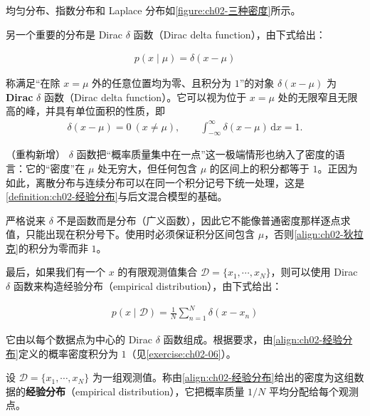 \documentclass[../../main.tex]{subfiles}
\begin{document}
均匀分布、指数分布和 Laplace 分布如\cref{figure:ch02-三种密度}所示。

另一个重要的分布是 Dirac $\delta$ 函数（Dirac delta function），由下式给出：

\begin{align}
  p(x\mid\mu) = \delta(x-\mu)
  \label{align:ch02-狄拉克}
\end{align}

\begin{definition}\label{definition:ch02-狄拉克delta}
称满足“在除 $x=\mu$ 外的任意位置均为零、且积分为 $1$”的对象 $\delta(x-\mu)$ 为 \textbf{Dirac} $\delta$ 函数（Dirac delta function）。它可以视为位于 $x=\mu$ 处的无限窄且无限高的峰，并具有单位面积的性质，即
\begin{align*}
  \delta(x-\mu) = 0 \ (x\neq\mu), \qquad \int_{-\infty}^{\infty}\delta(x-\mu)\,\mathrm{d}x = 1 .
\end{align*}
\end{definition}

\begin{remark}（重构新增）
$\delta$ 函数把“概率质量集中在一点”这一极端情形也纳入了密度的语言：它的“密度”在 $\mu$ 处无穷大，但任何包含 $\mu$ 的区间上的积分都等于 $1$。正因为如此，离散分布与连续分布可以在同一个积分记号下统一处理，这是\cref{definition:ch02-经验分布}与后文混合模型的基础。

严格说来 $\delta$ 不是函数而是分布（广义函数），因此它不能像普通密度那样逐点求值，只能出现在积分号下。使用时必须保证积分区间包含 $\mu$，否则\eqref{align:ch02-狄拉克}的积分为零而非 $1$。
\end{remark}

最后，如果我们有一个 $x$ 的有限观测值集合 $\mathcal{D}=\{x_1,\cdots,x_N\}$，则可以使用 Dirac $\delta$ 函数来构造经验分布（empirical distribution），由下式给出：

\begin{align}
  p(x\mid\mathcal{D}) = \frac{1}{N}\sum_{n=1}^{N}\delta(x-x_n)
  \label{align:ch02-经验分布}
\end{align}

它由以每个数据点为中心的 Dirac $\delta$ 函数组成。根据要求，由\eqref{align:ch02-经验分布}定义的概率密度积分为 $1$（见\cref{exercise:ch02-06}）。

\begin{definition}[经验分布]\label{definition:ch02-经验分布}
设 $\mathcal{D}=\{x_1,\cdots,x_N\}$ 为一组观测值。称由\eqref{align:ch02-经验分布}给出的密度为这组数据的\textbf{经验分布}（empirical distribution），它把概率质量 $1/N$ 平均分配给每个观测点。
\end{definition}
\end{document}
